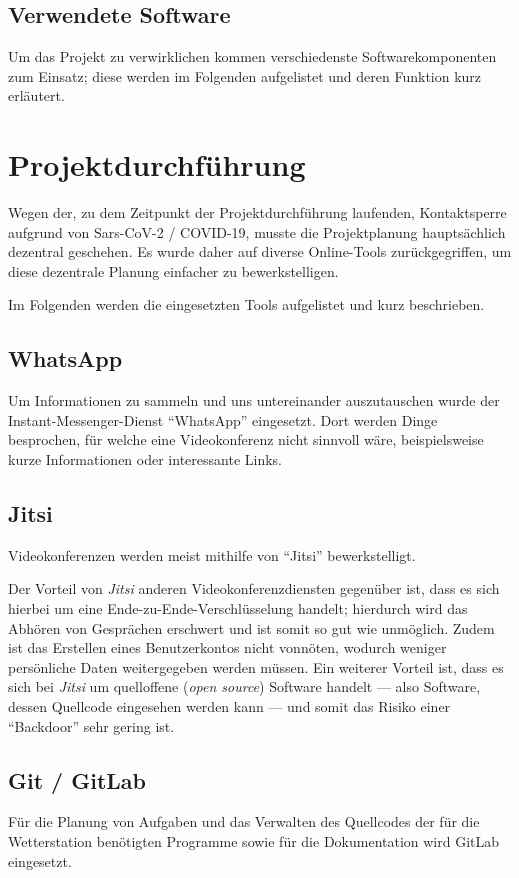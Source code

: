 \documentclass[a4paper,12pt]{article}
\begin{document}
\subsection{Verwendete Software}
Um das Projekt zu verwirklichen kommen verschiedenste Softwarekomponenten zum Einsatz; diese werden im Folgenden aufgelistet und deren Funktion kurz erläutert.

\pagebreak

\section{Projektdurchführung}
Wegen der, zu dem Zeitpunkt der Projektdurchführung laufenden, Kontaktsperre aufgrund von Sars-CoV-2 / COVID-19, musste die Projektplanung hauptsächlich dezentral geschehen.
Es wurde daher auf diverse Online-Tools zurückgegriffen, um diese dezentrale Planung einfacher zu bewerkstelligen.

Im Folgenden werden die eingesetzten Tools aufgelistet und kurz beschrieben.

\subsection{WhatsApp}
Um Informationen zu sammeln und uns untereinander auszutauschen wurde der Instant-Messenger-Dienst "`WhatsApp"' eingesetzt. Dort werden Dinge besprochen, für welche eine Videokonferenz nicht sinnvoll wäre, beispielsweise kurze Informationen oder interessante Links.

\subsection{Jitsi}
Videokonferenzen werden meist mithilfe von "`Jitsi"' bewerkstelligt.

Der Vorteil von \textit{Jitsi} anderen Videokonferenzdiensten gegenüber ist, dass es sich hierbei um eine Ende-zu-Ende-Verschlüsselung handelt; hierdurch wird das Abhören von Gesprächen erschwert und ist somit so gut wie unmöglich. Zudem ist das Erstellen eines Benutzerkontos nicht vonnöten, wodurch weniger persönliche Daten weitergegeben werden müssen. Ein weiterer Vorteil ist, dass es sich bei \textit{Jitsi} um quelloffene (\textit{open source}) Software handelt — also Software, dessen Quellcode eingesehen werden kann — und somit das Risiko einer "`Backdoor"' sehr gering ist.

\subsection{Git / GitLab}
Für die Planung von Aufgaben und das Verwalten des Quellcodes der für die Wetterstation benötigten Programme sowie für die Dokumentation wird GitLab eingesetzt.
\end{document}
